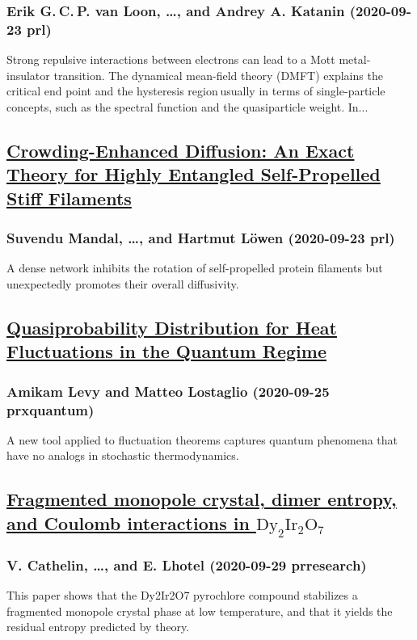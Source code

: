 \subsubsection*{Erik G. C. P. van Loon, \dots, and Andrey A. Katanin (2020-09-23 prl)}
Strong repulsive interactions between electrons can lead to a Mott metal-insulator transition. The dynamical mean-field theory (DMFT) explains the critical end point and the hysteresis region usually in terms of single-particle concepts, such as the spectral function and the quasiparticle weight. In...
\subsection*{\href{http://link.aps.org/doi/10.1103/PhysRevLett.125.138002}{Crowding-Enhanced Diffusion: An Exact Theory for Highly Entangled Self-Propelled Stiff Filaments}}
\subsubsection*{Suvendu Mandal, \dots, and Hartmut Löwen (2020-09-23 prl)}
A dense network inhibits the rotation of self-propelled protein filaments but unexpectedly promotes their overall diffusivity.
\subsection*{\href{http://link.aps.org/doi/10.1103/PRXQuantum.1.010309}{Quasiprobability Distribution for Heat Fluctuations in the Quantum Regime}}
\subsubsection*{Amikam Levy and Matteo Lostaglio (2020-09-25 prxquantum)}
A new tool applied to fluctuation theorems captures quantum phenomena that have no analogs in stochastic thermodynamics.
\subsection*{\href{http://link.aps.org/doi/10.1103/PhysRevResearch.2.032073}{Fragmented monopole crystal, dimer entropy, and Coulomb interactions in ${\mathrm{Dy}}_{2}{\mathrm{Ir}}_{2}{\mathrm{O}}_{7}$}}
\subsubsection*{V. Cathelin, \dots, and E. Lhotel (2020-09-29 prresearch)}
This paper shows that the Dy2Ir2O7 pyrochlore compound stabilizes a fragmented monopole crystal phase at low temperature, and that it yields the residual entropy predicted by theory.
